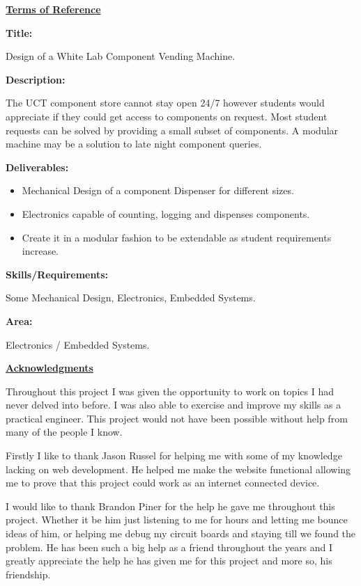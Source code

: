 \documentclass[a4paper,11pt]{article}
\numberwithin{figure}{section}
\numberwithin{table}{section}
\begin{document}
	{\centering\Huge\bfseries\underline{Terms of Reference}\par}
	{\Large\bfseries{Title:}\par}
	Design of a White Lab Component Vending Machine.\par
	{\Large\bfseries{Description:}\par}
	The UCT component store cannot stay open 24/7 however students would
appreciate if they could get access to components on request. Most student requests can be solved by providing a small subset of components. A modular machine may be a solution to late night component queries.\par
	{\Large\bfseries{Deliverables:}\par}
	{\begin{itemize}
	\item Mechanical Design of a component Dispenser for different sizes.
	\item Electronics capable of counting, logging and dispenses components.
	\item Create it in a modular fashion to be extendable as student
requirements increase.
	\end{itemize}}
	{\Large\bfseries{Skills/Requirements:}\par}
	Some Mechanical Design, Electronics, Embedded Systems.\par
	{\Large\bfseries{Area:}\par}
	Electronics / Embedded Systems.\par
	\newpage
	{\centering\Huge\bfseries\underline{Acknowledgments}\par}
	Throughout this project I was given the opportunity to work on topics I had never delved into before. I was also able to exercise and improve my skills as a practical engineer. This project would not have been possible without help from many of the people I know.
	
	Firstly I like to thank Jason Russel for helping me with some of my knowledge lacking on web development. He helped me make the website functional allowing me to prove that this project could work as an internet connected device.
	
	I would like to thank Brandon Piner for the help he gave me throughout this project. Whether it be him just listening to me for hours and letting me bounce ideas of him, or helping me debug my circuit boards and staying till we found the problem. He has been such a big help as a friend throughout the years and I greatly appreciate the help he has given me for this project and more so, his friendship.
	
\end{document}
